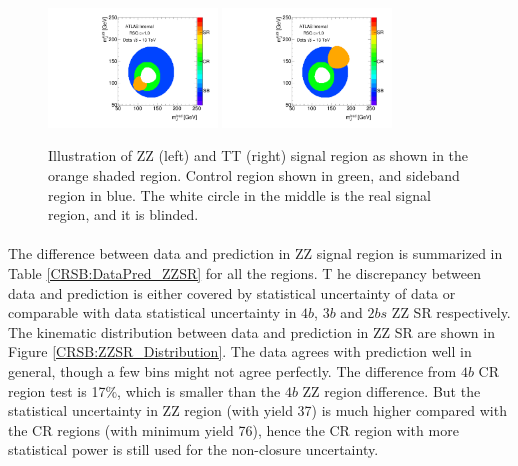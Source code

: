 \begin{figure}[htbp!]
\begin{center}
\includegraphics[width=0.4\textwidth,angle=-90]{figures/boosted/ZZ/Compare_NoTag_mH0H1.pdf}
\includegraphics[width=0.4\textwidth,angle=-90]{figures/boosted/TT/Compare_NoTag_mH0H1.pdf}
\end{center}
\caption{Illustration of ZZ (left) and TT (right) signal region as shown in the orange shaded region. Control region shown in green, and sideband region in blue. The white circle in the middle is the real signal region, and it is blinded.}
\label{CRSB:ZZIllustration}
\end{figure}

\paragraph{}
The difference between data and prediction in ZZ signal region is summarized in Table \ref{CRSB:DataPred_ZZSR} for all the regions. T
he discrepancy between data and prediction is either covered by statistical uncertainty of data or comparable with data statistical uncertainty in $4b$, $3b$ and $2bs$ ZZ SR respectively. 
The kinematic distribution between data and prediction in ZZ SR are shown in Figure \ref{CRSB:ZZSR_Distribution}. 
The data agrees with prediction well in general, though a few bins might not agree perfectly. 
The difference from $4b$ CR region test is 17$\%$, which is smaller than the $4b$ ZZ region difference. 
But the statistical uncertainty in ZZ region (with yield 37) is much higher compared with the CR regions (with minimum yield 76), hence the CR region with more statistical power is still used for the non-closure uncertainty.

